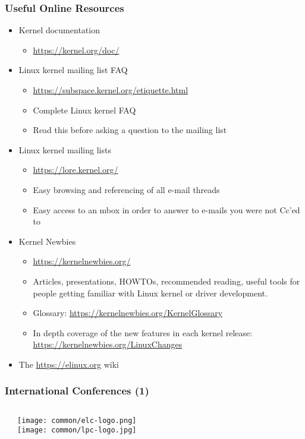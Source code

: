 \begin{frame}
  \frametitle{Useful Online Resources}
  \begin{itemize}
  \item Kernel documentation
    \begin{itemize}
    \item \url{https://kernel.org/doc/}
    \end{itemize}
  \item Linux kernel mailing list FAQ
    \begin{itemize}
    \item \url{https://subspace.kernel.org/etiquette.html}
    \item Complete Linux kernel FAQ
    \item Read this before asking a question to the mailing list
    \end{itemize}
  \item Linux kernel mailing lists
    \begin{itemize}
    \item \url{https://lore.kernel.org/}
    \item Easy browsing and referencing of all e-mail threads
    \item Easy access to an mbox in order to answer to e-mails you were
      not Cc'ed to
    \end{itemize}
  \item Kernel Newbies
    \begin{itemize}
    \item \url{https://kernelnewbies.org/}
    \item Articles, presentations, HOWTOs, recommended reading, useful
      tools for people getting familiar with Linux kernel or driver
      development.
    \item Glossary: \url{https://kernelnewbies.org/KernelGlossary}
    \item In depth coverage of the new features in each kernel release: \url{https://kernelnewbies.org/LinuxChanges}
    \end{itemize}
  \item The \url{https://elinux.org} wiki
\end{itemize}
\end{frame}

\begin{frame}
  \frametitle{International Conferences (1)}
  \begin{columns}
  \begin{itemize}
    
    
  \end{itemize}
     \texttt{[image: common/elc-logo.png]}\\
     \vspace{1cm}
     \texttt{[image: common/lpc-logo.jpg]}\\
  \end{columns}
\end{frame}

